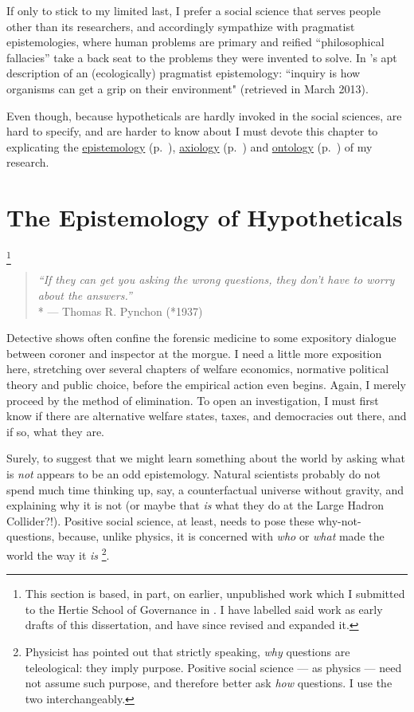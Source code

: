 If only to stick to my limited last, I prefer a social science that serves people other than its researchers, and accordingly sympathize with pragmatist epistemologies, where human problems are primary and reified ``philosophical fallacies'' \citep{Dewey1929} take a back seat to the problems they were invented to solve. %
In \citeauthor{Wikipedia2013}'s apt description of an (ecologically) pragmatist epistemology: ``inquiry is how organisms can get a grip on their environment" (retrieved in March 2013).

Even though, because hypotheticals are hardly invoked in the social sciences, are hard to specify, and are harder to know about I must devote this chapter to explicating the \hyperref[sec:epistemology]{epistemology} (p.~\pageref{sec:epistemology}), \hyperref[sec:axiology]{axiology} (p.~\pageref{sec:axiology}) and \hyperref[sec:ontology]{ontology} (p.~\pageref{sec:ontology}) of my research.

\section[Epistemology]{The Epistemology of Hypotheticals} \label{sec:epistemology}
\footnote{
	\label{fn:also-in-europe} This section is based, in part, on earlier, unpublished work which I submitted to the Hertie School of Governance in \cite{Held2012a}. I have labelled said work as early drafts of this dissertation, and have since revised and expanded it.
}

\begin{quote}
	\emph{``If they can get you asking the wrong questions, they don't have to worry about the answers.''}\\*
	--- Thomas R. Pynchon (*1937)
\end{quote}

Detective shows often confine the forensic medicine to some expository dialogue between coroner and inspector at the morgue.
I need a little more exposition here, stretching over several chapters of welfare economics, normative political theory and public choice, before the empirical action even begins.
Again, I merely proceed by the method of elimination.
To open an investigation, I must first know if there are alternative welfare states, taxes, and democracies out there, and if so, what they are. %

Surely, to suggest that we might learn something about the world by asking what is \emph{not} appears to be an odd epistemology.
Natural scientists probably do not spend much time thinking up, say, a counterfactual universe without gravity, and explaining why it is not (or maybe that \emph{is} what they do at the Large Hadron Collider?!).
Positive social science, at least, needs to pose these why-not-questions, because, unlike physics, it is concerned with \emph{who} or \emph{what} made the world the way it \emph{is}
\footnote{
	Physicist \citet{Krauss2012} has pointed out that strictly speaking, \emph{why} questions are teleological: they imply purpose.
	Positive social science --- as physics --- need not assume such purpose, and therefore better ask \emph{how} questions.
	I use the two interchangeably.
}.

